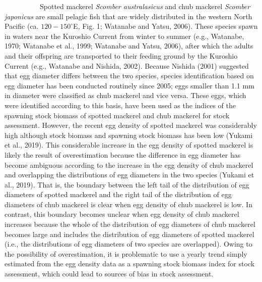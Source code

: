 \documentclass[12pt]{article}
\begin{document}
\begin{linenumbers}
\ \ \ \ \ \ \ \ \ \
Spotted mackerel \textit{Scomber australasicus} and chub mackerel \textit{Scomber japonicus} are small pelagic fish that are widely distributed in the western North Pacific (ca. $\textrm{120}-\textrm{150}^{\circ}$E, Fig. 1; Watanabe and Yatsu, 2006). These species spawn in waters near the Kuroshio Current from winter to summer (e.g., Watanabe, 1970; Watanabe et al., 1999; Watanabe and Yatsu, 2006), after which the adults and their offspring are transported to their feeding ground by the Kuroshio Current (e.g., Watanabe and Nishida, 2002). Because Nishida (2001) suggested that egg diameter differs between the two species, species identification based on egg diameter has been conducted routinely since 2005; eggs smaller than 1.1 mm in diameter were classified as chub mackerel and vice versa. These eggs, which were identified according to this basis, have been used as the indices of the spawning stock biomass of spotted mackerel and chub mackerel for stock assessment. However, the recent egg density of spotted mackerel was considerably high although stock biomass and spawning stock biomass has been low (Yukami et al., 2019). This considerable increase in the egg density of spotted mackerel is likely the result of overestimation because the difference in egg diameter has become ambiguous according to the increase in the egg density of chub mackerel and overlapping the distributions of egg diameters in the two species (Yukami et al., 2019). That is, the boundary between the left tail of the distribution of egg diameters of spotted mackerel and the right tail of the distribution of egg diameters of chub mackerel is clear when egg density of chub mackerel is low. In contrast, this boundary becomes unclear when egg density of chub mackerel increases because the whole of the distribution of egg diameters of chub mackerel becomes large and includes the distribution of egg diameters of spotted mackerel (i.e., the distributions of egg diameters of two species are overlapped). Owing to the possibility of overestimation, it is problematic to use a yearly trend simply estimated from the egg density data as a spawning stock biomass index for stock assessment, which could lead to sources of bias in stock assessment.


\end{linenumbers}
\end{document}
